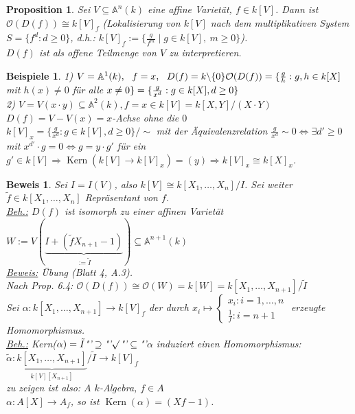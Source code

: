 \documentclass[a4paper,12pt]{report}
\theoremstyle{break}
\newtheorem{Prop}[Def]{Proposition}
\newtheorem{Bsp}[Def]{Beispiele}
\theoremstyle{nonumberbreak}
\theoremstyle{nonumberplain}
\newtheorem{Bew}{Beweis}
\DeclareMathOperator{\Kern}{Kern}
\begin{document}
\begin{Prop}
Sei $V\subseteq\mathbb{A}^n(k)$ eine affine Varietät, $f\in k[V]$. Dann ist $\mathcal{O}(D(f))\cong k[V]_f$ (Lokalisierung von $k[V]$ nach dem multiplikativen System $S=\{f^d: d\geq 0\}$, d.h.: $k[V]_f:=\{\frac{g}{f^m}\mid g\in k[V], ~ m \geq 0\}$).\\
$D(f)$ ist als offene Teilmenge von $V$ zu interpretieren.
\end{Prop}
\begin{Bsp}
1) $V=\mathbb{A}^1(k),~~f=x,~~ D(f)=k\backslash \{0\}\\
\mathcal{O}(D(f))=\{\frac{g}{h}: g,h\in k[X]$ mit $h(x)\neq 0$ für alle $x\neq 0\}\\
=\{\frac{g}{x^d}: g\in k[X], d\geq 0\}$\\
2) $V=V(x\cdot y)\subseteq \mathbb{A}^2(k), f=x\in k[V]=k[X,Y]/(X\cdot Y)$\\
$D(f)=V-V(x)= x$-Achse ohne die $0$\\
$k[V]_x=\{\frac{g}{x^d}: g\in k[V], d\geq 0\}/\sim$ mit der Äquivalenzrelation $\frac{g}{x^d} \sim 0\Leftrightarrow \exists d'\geq 0$ mit $x^{d'}\cdot g=0\Leftrightarrow g=y\cdot g'$ für ein $g'\in k[V]\Rightarrow \operatorname{Kern}(k[V]\rightarrow k[V]_x)=(y)\Rightarrow k[V]_x\cong k[X]_x$.
\end{Bsp}
\begin{Bew}
Sei $I=I(V)$, also $k[V]\cong k[X_1,\dots,X_n]/I$. Sei weiter $\tilde{f}\in k[X_1,\dots,X_n]$ Repräsentant von $f$.\\
\underline{Beh.:} $D(f)$ ist isomorph zu einer affinen Varietät $W:=V(\underbrace{I+(\tilde{f}X_{n+1}-1)}_{:=\tilde{I}})\subseteq \mathbb{A}^{n+1}(k)$\\
\underline{Beweis:} Übung (Blatt 4, A.3).\\
Nach Prop. 6.4: $\mathcal{O}(D(f))\cong\mathcal{O}(W)=k[W]=k[X_1,\dots,X_{n+1}]/\tilde{I}$\\
Sei $\alpha: k[X_1,\dots,X_{n+1}] \rightarrow k[V]_f$ der durch $x_i\mapsto\begin{cases}
x_i: i=1,\dots,n\\
\frac{1}{f}: i=n+1
\end{cases}$ erzeugte Homomorphismus.\\
\underline{Beh.:} Kern($\alpha)=\tilde{I}\\
$"'$\supseteq$"'$ \surd\\
$"'$\subseteq$"'$ \alpha$ induziert einen Homomorphismus: $\tilde{\alpha}:\underbrace{k[X_1,\dots,X_{n+1}]}_{k[V][X_{n+1}]}/\tilde{I}\rightarrow k[V]_f$\\
zu zeigen ist also: $A$ $k$-Algebra, $f\in A$\\
$\alpha: A[X]\rightarrow A_f$, so ist $\Kern(\alpha)=(Xf-1)$.
\end{Bew}
\end{document}
